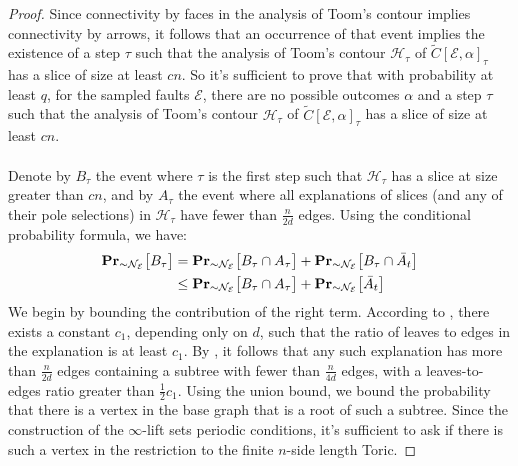 \begin{proof}
    Since connectivity by faces in the analysis of Toom's contour implies connectivity by arrows, it follows that an occurrence of that event implies the existence of a step $\tau$ such that the analysis of Toom's contour $\mathcal{H}_{\tau}$ of $\tilde{C}[\mathcal{E},\alpha]_{\tau}$ has a slice of size at least $cn$. So it's sufficient to prove that with probability at least $q$, for the sampled faults $\mathcal{E}$, there are no possible outcomes $\alpha$ and a step $\tau$ such that the analysis of Toom's contour $\mathcal{H}_{\tau}$ of $\tilde{C}[\mathcal{E},\alpha]_{\tau}$ has a slice of size at least $cn$.
    \paragraph{} 
    
Denote by $B_{\tau}$ the event where $\tau$ is the first step such that $\mathcal{H}_{\tau}$ has a slice at size greater than $cn$, and by $A_{\tau}$ the event where all explanations of slices (and any of their pole selections) in $\mathcal{H}_{\tau}$ have fewer than $\frac{n}{2d}$ edges. Using the conditional probability formula, we have:
    \begin{equation*}
      \begin{split}
        \prbm{  B_{\tau}    }{ \sim \mathcal{N}_{\mathcal{E}} } & =  \prbm{  B_{\tau}  \cap A_{\tau}  }{ \sim \mathcal{N}_{\mathcal{E}} } + \prbm{  B_{\tau} \cap \bar{A}_{t}    }{ \sim \mathcal{N}_{\mathcal{E}} }  \\
  & \le \prbm{  B_{\tau}  \cap A_{\tau}  }{ \sim \mathcal{N}_{\mathcal{E}} } + \prbm{ \bar{A}_{t}    }{ \sim \mathcal{N}_{\mathcal{E}} }  \\
      \end{split}
    \end{equation*}
    We begin by bounding the contribution of the right term. According to , there exists a constant $c_{1}$, depending only on $d$, such that the ratio of leaves to edges in the explanation is at least $c_{1}$. By , it follows that any such explanation has more than $\frac{n}{2d}$ edges containing a subtree with fewer than $\frac{n}{4d}$ edges, with a leaves-to-edges ratio greater than $\frac{1}{2} c_{1}$. Using the union bound, we bound the probability that there is a vertex in the base graph that is a root of such a subtree. Since the construction of the $\infty$-lift sets periodic conditions, it's sufficient to ask if there is such a vertex in the restriction to the finite $n$-side length Toric.

\end{proof}
